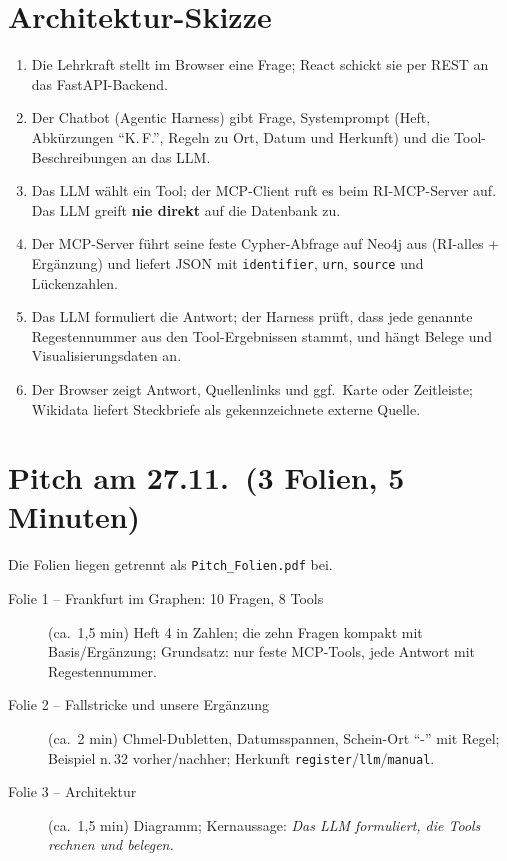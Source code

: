 \documentclass[10pt,a4paper]{article}
\newcommand{\code}[1]{\texttt{\small #1}}
\begin{document}
\section{Architektur-Skizze}

\begin{center}
\resizebox{\textwidth}{!}{}
\end{center}

\begin{enumerate}
\item Die Lehrkraft stellt im Browser eine Frage; React schickt sie per REST an das FastAPI-Backend.
\item Der Chatbot (Agentic Harness) gibt Frage, Systemprompt (Heft, Abkürzungen \enquote{K.\,F.}, Regeln zu Ort, Datum und Herkunft) und die Tool-Beschreibungen an das LLM.
\item Das LLM wählt ein Tool; der MCP-Client ruft es beim RI-MCP-Server auf. Das LLM greift \textbf{nie direkt} auf die Datenbank zu.
\item Der MCP-Server führt seine feste Cypher-Abfrage auf Neo4j aus (RI-alles + Ergänzung) und liefert JSON mit \code{identifier}, \code{urn}, \code{source} und Lückenzahlen.
\item Das LLM formuliert die Antwort; der Harness prüft, dass jede genannte Regestennummer aus den Tool-Ergebnissen stammt, und hängt Belege und Visualisierungsdaten an.
\item Der Browser zeigt Antwort, Quellenlinks und ggf.\ Karte oder Zeitleiste; Wikidata liefert Steckbriefe als gekennzeichnete externe Quelle.
\end{enumerate}

\section{Pitch am 27.11.\ (3 Folien, 5 Minuten)}
Die Folien liegen getrennt als \code{Pitch\_Folien.pdf} bei.
\begin{description}
\item[Folie 1 -- Frankfurt im Graphen: 10 Fragen, 8 Tools] (ca.\ 1,5 min) Heft 4 in Zahlen; die zehn Fragen kompakt mit Basis/Ergänzung; Grundsatz: nur feste MCP-Tools, jede Antwort mit Regestennummer.
\item[Folie 2 -- Fallstricke und unsere Ergänzung] (ca.\ 2 min) Chmel-Dubletten, Datumsspannen, Schein-Ort \enquote{-} mit Regel; Beispiel n.\,32 vorher/nachher; Herkunft \code{register}/\code{llm}/\code{manual}.
\item[Folie 3 -- Architektur] (ca.\ 1,5 min) Diagramm; Kernaussage: \emph{Das LLM formuliert, die Tools rechnen und belegen.}
\end{description}
\end{document}
